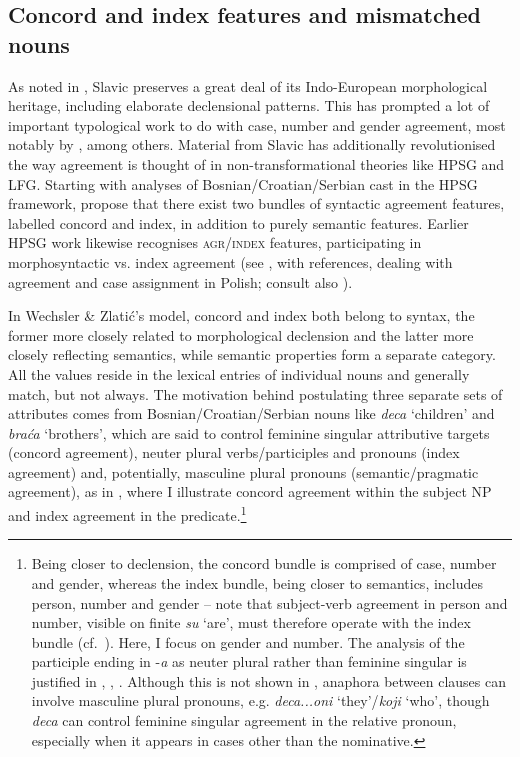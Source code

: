 \documentclass[output=paper,hidelinks]{langscibook}
\begin{document}
\subsection{Concord and index features and mismatched nouns}
\label{sec:Slavic:2.2}

As noted in , Slavic preserves a great deal of its Indo-European morphological heritage, including elaborate declensional patterns. This has prompted a lot of important typological work to do with case, number and gender agreement, most notably by \citet{Corbett1983,Corbett1986,corbett06}, among others. Material from Slavic has additionally revolutionised the way agreement is thought of in non-transformational theories like HPSG and LFG. Starting with analyses of Bosnian/Croatian/Serbian cast in the HPSG framework, \citet{WechslerZlatic2000,WechslerZlatic:Agreement2003} propose that there exist two bundles of syntactic agreement features, labelled concord and index, in addition to purely semantic features. Earlier HPSG work likewise recognises \textsc{agr/index} features, participating in morphosyntactic vs. index agreement (see \citealt{kcz:prz:95}, with references, dealing with agreement and case assignment in Polish; consult also ). 

In Wechsler \& Zlati\'{c}'s model, concord and index both belong to syntax, the former more closely related to morphological declension and the latter more closely reflecting semantics, while semantic properties form a separate category. All the values reside in the lexical entries of individual nouns and generally match, but not always. The motivation behind postulating three separate sets of attributes comes from Bosnian/Croatian/Serbian nouns like \textit{deca} `children' and \textit{bra\'{c}a} `brothers', which are said to control feminine singular attributive targets (concord agreement), neuter plural verbs/participles and pronouns (index agreement) and, potentially, masculine plural pronouns (semantic/pragmatic agreement), as in , where I illustrate concord agreement within the subject NP and index agreement in the predicate.\footnote{Being closer to declension, the concord bundle is comprised of case, number and gender, whereas the index bundle, being closer to semantics, includes person, number and gender -- note that subject-verb agreement in person and number, visible on finite \textit{su} `are', must therefore operate with the index bundle (cf.\ \citealt[69--71]{DLM:LFG}). Here, I focus on gender and number. The analysis of the participle ending in -\textit{a} as neuter plural rather than feminine singular is justified in \citet{WechslerZlatic:Agreement2003,Wechsler:Wrong}, \citet{DH:Agr}, \citet{Hristov2012,Hristov:LFG13}. Although this is not shown in , anaphora between clauses can involve masculine plural pronouns, e.g. \textit{deca...oni} `they'/\textit{koji} `who', though \textit{deca} can control feminine singular agreement in the relative pronoun, especially when it appears in cases other than the nominative.}
\end{document}
